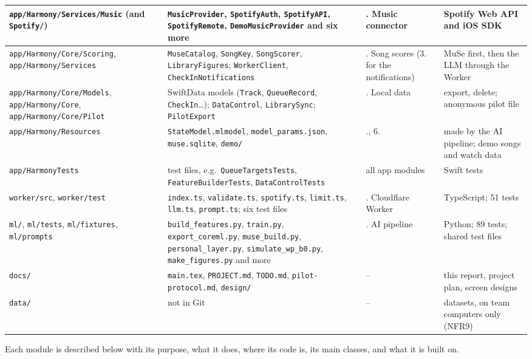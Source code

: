 \documentclass[conference]{IEEEtran}
\begin{document}
\begin{table}[!t]
\begin{tabularx}{\textwidth}{|>{\raggedright\arraybackslash}p{4.1cm}|>{\raggedright\arraybackslash}X|>{\raggedright\arraybackslash}p{2.1cm}|>{\raggedright\arraybackslash}p{3.4cm}|}
\texttt{app/Harmony/Services/Music} (and \texttt{Spotify/}) & \texttt{MusicProvider}, \texttt{SpotifyAuth}, \texttt{SpotifyAPI}, \texttt{SpotifyRemote}, \texttt{DemoMusicProvider} and six more & 5. Music connector & Spotify Web API and iOS SDK \\ \hline
\texttt{app/Harmony/Core/Scoring}, \texttt{app/Harmony/Services} & \texttt{MuseCatalog}, \texttt{SongKey}, \texttt{SongScorer}, \texttt{LibraryFigures}; \texttt{WorkerClient}, \texttt{CheckInNotifications} & 6. Song scores (3. for the notifications) & MuSe first, then the LLM through the Worker \\ \hline
\texttt{app/Harmony/Core/Models}, \texttt{app/Harmony/Core}, \texttt{app/Harmony/Core/Pilot} & 10 SwiftData models (\texttt{Track}, \texttt{QueueRecord}, \texttt{CheckIn}\ldots); \texttt{DataControl}, \texttt{LibrarySync}; \texttt{PilotExport} & 7. Local data & export, delete; anonymous pilot file \\ \hline
\texttt{app/Harmony/Resources} & \texttt{StateModel.mlmodel}, \texttt{model\_params.json}, \texttt{muse.sqlite}, \texttt{demo/} & 3., 6. & made by the AI pipeline; demo songs and watch data \\ \hline
\texttt{app/HarmonyTests} & 46 test files, e.g.\ \texttt{QueueTargetsTests}, \texttt{FeatureBuilderTests}, \texttt{DataControlTests} & all app modules & 281 Swift tests \\ \hline
\texttt{worker/src}, \texttt{worker/test} & \texttt{index.ts}, \texttt{validate.ts}, \texttt{spotify.ts}, \texttt{limit.ts}, \texttt{llm.ts}, \texttt{prompt.ts}; six test files & 8. Cloudflare Worker & TypeScript; 51 tests \\ \hline
\texttt{ml/}, \texttt{ml/tests}, \texttt{ml/fixtures}, \texttt{ml/prompts} & \texttt{build\_features.py}, \texttt{train.py}, \texttt{export\_coreml.py}, \texttt{muse\_build.py}, \texttt{personal\_layer.py}, \texttt{simulate\_wp\_b0.py}, \texttt{make\_figures.py} and more & 9. AI pipeline & Python; 89 tests; shared test files \\ \hline
\texttt{docs/} & \texttt{main.tex}, \texttt{PROJECT.md}, \texttt{TODO.md}, \texttt{pilot-protocol.md}, \texttt{design/} & -- & this report, project plan, screen designs \\ \hline
\texttt{data/} & not in Git & -- & datasets, on team computers only (NFR9) \\ \hline
\end{tabularx}
\end{table}

Each module is described below with its purpose, what it does, where its code is, its main classes, and what it is built on.
\end{document}
